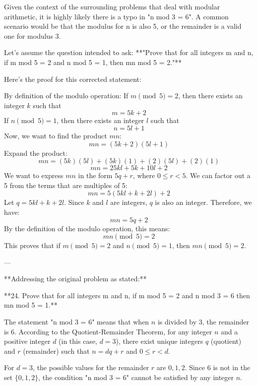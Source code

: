 \documentclass{article}
\begin{document}
Given the context of the surrounding problems that deal with modular arithmetic, it is highly likely there is a typo in "n mod 3 = 6". A common scenario would be that the modulus for n is also 5, or the remainder is a valid one for modulus 3.

Let's assume the question intended to ask:
**"Prove that for all integers m and n, if m mod 5 = 2 and n mod 5 = 1, then mn mod 5 = 2."**

Here's the proof for this corrected statement:

By definition of the modulo operation:
If $m \pmod{5} = 2$, then there exists an integer $k$ such that
$$ m = 5k + 2 $$
\vspace{10pt}
If $n \pmod{5} = 1$, then there exists an integer $l$ such that
$$ n = 5l + 1 $$
\vspace{10pt}
Now, we want to find the product $mn$:
$$ mn = (5k + 2)(5l + 1) $$
\vspace{10pt}
Expand the product:
$$ mn = (5k)(5l) + (5k)(1) + (2)(5l) + (2)(1) $$
\vspace{10pt}
$$ mn = 25kl + 5k + 10l + 2 $$
\vspace{10pt}
We want to express $mn$ in the form $5q + r$, where $0 \leq r < 5$. We can factor out a 5 from the terms that are multiples of 5:
$$ mn = 5(5kl + k + 2l) + 2 $$
\vspace{10pt}
Let $q = 5kl + k + 2l$. Since $k$ and $l$ are integers, $q$ is also an integer.
\vspace{10pt}
Therefore, we have:
$$ mn = 5q + 2 $$
\vspace{10pt}
By the definition of the modulo operation, this means:
$$ mn \pmod{5} = 2 $$
\vspace{10pt}
This proves that if $m \pmod{5} = 2$ and $n \pmod{5} = 1$, then $mn \pmod{5} = 2$.

---

**Addressing the original problem as stated:**

**24. Prove that for all integers m and n, if m mod 5 = 2 and n mod 3 = 6 then mn mod 5 = 1.**

The statement "n mod 3 = 6" means that when $n$ is divided by 3, the remainder is 6. According to the Quotient-Remainder Theorem, for any integer $n$ and a positive integer $d$ (in this case, $d=3$), there exist unique integers $q$ (quotient) and $r$ (remainder) such that $n = dq + r$ and $0 \leq r < d$.

For $d=3$, the possible values for the remainder $r$ are $0, 1, 2$.
Since 6 is not in the set $\{0, 1, 2\}$, the condition "n mod 3 = 6" cannot be satisfied by any integer $n$.
\end{document}

